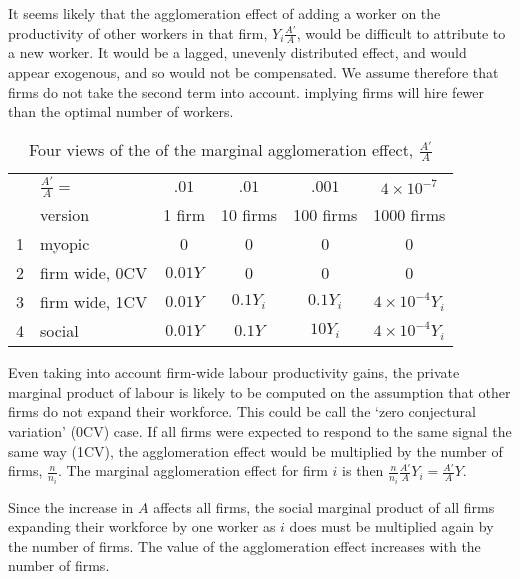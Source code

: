 It seems likely that the agglomeration effect of adding a worker on the productivity of other workers in that firm, $Y_i \frac{A'}{A}$, would be difficult to attribute to a new worker. It would be a lagged, unevenly distributed effect, and would appear exogenous, and so would not be compensated. We assume therefore that firms do not take the second term into account. %
implying firms will hire fewer than the optimal number of workers.
\begin{table}[htbp]
\caption[Four views of the of the marginal agglomeration effect]{Four views of the of the marginal agglomeration effect, $\frac{A'}{A}$}

\begin{center}%
\begin{tabular}{rlcccc}\small
    & 	\hspace{2cm}$\frac{A'}{A}=$	& $.01$ & $.01$ & $.001$  &  $4\times 10^{-7}$\\ \cline{3-4}
\   &  	version  		& 1 firm 		&10 firms		&100 firms 	& 1000 firms		\\ \hline%
 1 &myopic 		&0 			 & 0			& 0       		&	0				\\
 2 &firm wide, 0CV 	& $0.01Y$ & 0           & 0	& 0\\
 3 &firm wide, 1CV	& $0.01Y$		& $0.1Y_i	$	& $0.1Y_i$	&$4\times 10^{-4}Y_i$	\\
4  &social 			& $0.01Y$ 	&  $0.1Y$		& $10Y_i$		&$4\times 10^{-4}Y_i$	\\
 \hline
\end{tabular}
\end{center}
\label{table-marginal-agglomeration}
\end{table}%


Even taking into account firm-wide labour productivity gains, the private marginal product of labour is likely to be computed on the assumption that other firms do not expand  their workforce. This could be call the `zero conjectural variation' (0CV) case. 
If all firms  were expected to respond to the same signal the same way (1CV), the agglomeration effect  would be multiplied by the number of firms, $\frac{n }{n_i}$. The marginal agglomeration effect for firm $i$ is then $\frac{n }{n_i}\frac{A' }{A}Y_i =\frac{A' }{A}Y$. 

Since the increase in $A$ affects all firms, the  social marginal product of all firms expanding their workforce by one worker as $i$ does must be multiplied again by the number of firms. The  value of the agglomeration effect increases with the number of firms. 

